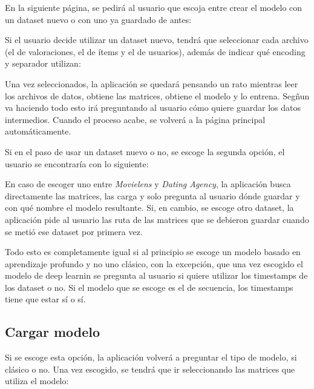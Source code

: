 En la siguiente página, se pedirá al usuario que escoja entre crear el modelo con un dataset nuevo o con uno ya guardado de antes:


Si el usuario decide utilizar un dataset nuevo, tendrá que seleccionar cada archivo (el de valoraciones, el de ítems y el de usuarios), además de indicar qué encoding y separador utilizan:


Una vez seleccionados, la aplicación se quedará pensando un rato mientras leer los archivos de datos, obtiene las matrices, obtiene el modelo y lo entrena. Segñun va haciendo todo esto irá preguntando al usuario cómo quiere guardar los datos intermedios. Cuando el proceso acabe, se volverá a la página principal automáticamente.

Si en el paso de usar un dataset nuevo o no, se escoge la segunda opción, el usuario se encontraría con lo siguiente:


En caso de escoger uno entre \textit{Movielens} y \textit{Dating Agency}, la aplicación busca directamente las matrices, las carga y solo pregunta al usuario dónde guardar y con qué nombre el modelo resultante. Si, en cambio, se escoge otro dataset, la aplicación pide al usuario las ruta de las matrices que se debieron guardar cuando se metió ese dataset por primera vez.

Todo esto es completamente igual si al principio se escoge un modelo basado en aprendizaje profundo y no uno clásico, con la excepción, que una vez escogido el modelo de deep learnin se pregunta al usuario si quiere utilizar los timestamps de los dataset o no. Si el modelo que se escoge es el de secuencia, los timestamps tiene que estar sí o sí.


\subsection{Cargar modelo}\label{cargar-modelo}
Si se escoge esta opción, la aplicación volverá a preguntar el tipo de modelo, si clásico o no. Una vez escogido, se tendrá que ir seleccionando las matrices que utiliza el modelo:

